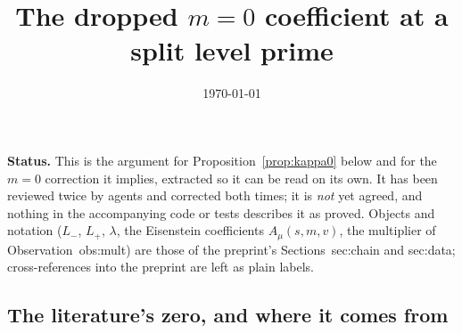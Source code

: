 \documentclass[11pt,reqno]{amsart}
\theoremstyle{plain}
\theoremstyle{definition}
\newcommand{\Lm}{L_{-}}
\newcommand{\Lp}{L_{+}}
\begin{document}
\title{The dropped $m=0$ coefficient at a split level prime}
\author{}
\date{\today}
\maketitle

\noindent\textbf{Status.} This is the argument for Proposition~\ref{prop:kappa0} below and for the
$m=0$ correction it implies, extracted so it can be read on its own. It has been reviewed twice by
agents and corrected both times; it is \emph{not} yet agreed, and nothing in the accompanying code
or tests describes it as proved. Objects and notation ($\Lm$, $\Lp$, $\lambda$, the Eisenstein
coefficients $A_\mu(s,m,v)$, the multiplier of Observation~obs:mult) are those of the preprint's
Sections~sec:chain and sec:data; cross-references into the preprint are left as plain labels.

\subsection*{The literature's zero, and where it comes from}
\end{document}
